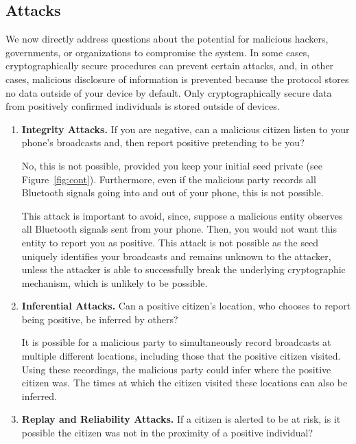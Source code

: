 \documentclass{article}
\begin{document}
\subsection{Attacks}

 We now directly address questions about the potential for malicious hackers, governments, or organizations to compromise the system. In some cases, cryptographically secure procedures can prevent certain attacks, and, in other cases, malicious disclosure of information is prevented because the protocol stores no data outside of your device by default. Only cryptographically secure data from positively confirmed individuals is  stored outside of devices.

\begin{enumerate}[leftmargin=*]

\item \textbf{Integrity Attacks.} If you are negative, can a malicious citizen listen to your phone's broadcasts and, then report positive pretending to be you? 

   No, this is not possible, provided you keep your initial seed private (see Figure~\ref{fig:cont}). Furthermore, even if the malicious party records all Bluetooth signals going into and out of your phone, this is not possible.
   
   This attack is important to avoid, since, suppose a malicious entity observes all Bluetooth signals sent from your phone. Then, you would not want this entity to report you as positive. This attack is not possible as the seed uniquely identifies your broadcasts and remains unknown to the attacker, unless the attacker is able to successfully break the underlying cryptographic mechanism, which is unlikely to be possible. 
   
 

  \item \textbf{Inferential Attacks.} Can a positive citizen's location, who chooses to report being positive, be inferred by others?
  
    It is possible for a malicious party to simultaneously record broadcasts at multiple different locations, including those that the positive citizen visited. Using these recordings, the malicious party could infer where the  positive citizen was. The times at which the citizen visited these locations can also be inferred. 
  



    \item \textbf{Replay and Reliability Attacks.}  If a citizen is alerted to be at risk, is it possible the citizen was not in the proximity of a positive individual?  
    

\end{enumerate}
\end{document}
